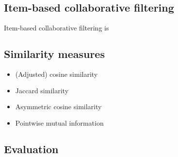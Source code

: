 \subsection{Item-based collaborative filtering}

Item-based collaborative filtering is \cite{Sarwar2001}



\subsection{Similarity measures}

\begin{itemize}
  \item (Adjusted) cosine similarity
  \item Jaccard similarity
  \item Asymmetric cosine similarity
  \item Pointwise mutual information
\end{itemize}



\subsection{Evaluation}
